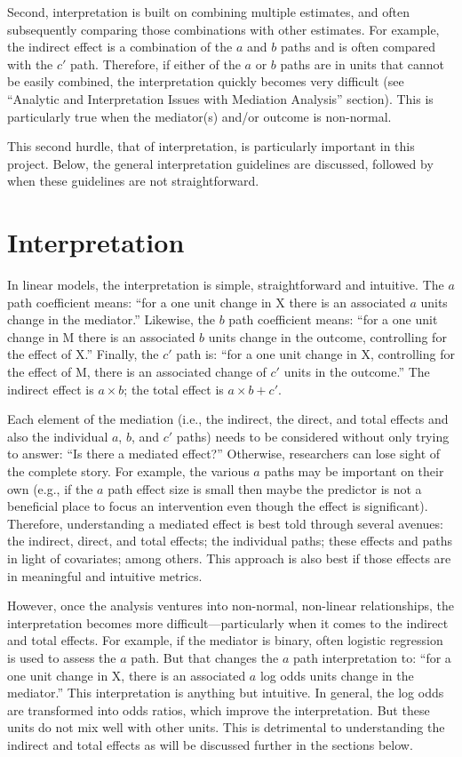 \documentclass[]{article}
\begin{document}
Second, interpretation is built on combining multiple estimates, and
often subsequently comparing those combinations with other estimates.
For example, the indirect effect is a combination of the \(a\) and \(b\)
paths and is often compared with the \(c'\) path. Therefore, if either
of the \(a\) or \(b\) paths are in units that cannot be easily combined,
the interpretation quickly becomes very difficult (see ``Analytic and
Interpretation Issues with Mediation Analysis'' section). This is
particularly true when the mediator(s) and/or outcome is non-normal.

This second hurdle, that of interpretation, is particularly important in
this project. Below, the general interpretation guidelines are
discussed, followed by when these guidelines are not straightforward.

\section{Interpretation}\label{interpretation}

In linear models, the interpretation is simple, straightforward and
intuitive. The \(a\) path coefficient means: ``for a one unit change in
X there is an associated \(a\) units change in the mediator.'' Likewise,
the \(b\) path coefficient means: ``for a one unit change in M there is
an associated \(b\) units change in the outcome, controlling for the
effect of X.'' Finally, the \(c'\) path is: ``for a one unit change in
X, controlling for the effect of M, there is an associated change of
\(c'\) units in the outcome.'' The indirect effect is \(a \times b\);
the total effect is \(a \times b + c'\).

Each element of the mediation (i.e., the indirect, the direct, and total
effects and also the individual \(a\), \(b\), and \(c'\) paths) needs to
be considered without only trying to answer: ``Is there a mediated
effect?'' Otherwise, researchers can lose sight of the complete story.
For example, the various \(a\) paths may be important on their own
(e.g., if the \(a\) path effect size is small then maybe the predictor
is not a beneficial place to focus an intervention even though the
effect is significant). Therefore, understanding a mediated effect is
best told through several avenues: the indirect, direct, and total
effects; the individual paths; these effects and paths in light of
covariates; among others. This approach is also best if those effects
are in meaningful and intuitive metrics.

However, once the analysis ventures into non-normal, non-linear
relationships, the interpretation becomes more difficult---particularly
when it comes to the indirect and total effects. For example, if the
mediator is binary, often logistic regression is used to assess the
\(a\) path. But that changes the \(a\) path interpretation to: ``for a
one unit change in X, there is an associated \(a\) log odds units change
in the mediator.'' This interpretation is anything but intuitive. In
general, the log odds are transformed into odds ratios, which improve
the interpretation. But these units do not mix well with other units.
This is detrimental to understanding the indirect and total effects as
will be discussed further in the sections below.
\end{document}

